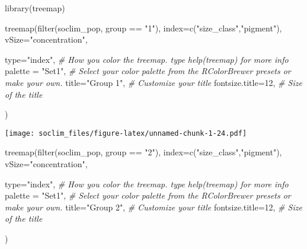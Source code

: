 \documentclass[
]{article}
\newenvironment{Shaded}{\begin{snugshade}}{\end{snugshade}}
\newcommand{\AttributeTok}[1]{\textcolor[rgb]{0.77,0.63,0.00}{#1}}
\newcommand{\CommentTok}[1]{\textcolor[rgb]{0.56,0.35,0.01}{\textit{#1}}}
\newcommand{\DecValTok}[1]{\textcolor[rgb]{0.00,0.00,0.81}{#1}}
\newcommand{\FunctionTok}[1]{\textcolor[rgb]{0.00,0.00,0.00}{#1}}
\newcommand{\NormalTok}[1]{#1}
\newcommand{\SpecialCharTok}[1]{\textcolor[rgb]{0.00,0.00,0.00}{#1}}
\newcommand{\StringTok}[1]{\textcolor[rgb]{0.31,0.60,0.02}{#1}}
\begin{document}
\begin{Shaded}
\begin{Highlighting}[]
\FunctionTok{library}\NormalTok{(treemap)}

\FunctionTok{treemap}\NormalTok{(}\FunctionTok{filter}\NormalTok{(soclim\_pop, group }\SpecialCharTok{==} \StringTok{"1"}\NormalTok{), }\AttributeTok{index=}\FunctionTok{c}\NormalTok{(}\StringTok{"size\_class"}\NormalTok{,}\StringTok{"pigment"}\NormalTok{), }\AttributeTok{vSize=}\StringTok{"concentration"}\NormalTok{,}
        
        \AttributeTok{type=}\StringTok{"index"}\NormalTok{,                            }\CommentTok{\# How you color the treemap. type help(treemap) for more info}
        \AttributeTok{palette =} \StringTok{"Set1"}\NormalTok{,                        }\CommentTok{\# Select your color palette from the RColorBrewer presets or make your own.}
        \AttributeTok{title=}\StringTok{"Group 1"}\NormalTok{,                      }\CommentTok{\# Customize your title}
        \AttributeTok{fontsize.title=}\DecValTok{12}\NormalTok{,                       }\CommentTok{\# Size of the title}
        
\NormalTok{) }
\end{Highlighting}
\end{Shaded}

\texttt{[image: soclim\_files/figure-latex/unnamed-chunk-1-24.pdf]}

\begin{Shaded}
\begin{Highlighting}[]
\FunctionTok{treemap}\NormalTok{(}\FunctionTok{filter}\NormalTok{(soclim\_pop, group }\SpecialCharTok{==} \StringTok{"2"}\NormalTok{), }\AttributeTok{index=}\FunctionTok{c}\NormalTok{(}\StringTok{"size\_class"}\NormalTok{,}\StringTok{"pigment"}\NormalTok{), }\AttributeTok{vSize=}\StringTok{"concentration"}\NormalTok{,}
        
        \AttributeTok{type=}\StringTok{"index"}\NormalTok{,                            }\CommentTok{\# How you color the treemap. type help(treemap) for more info}
        \AttributeTok{palette =} \StringTok{"Set1"}\NormalTok{,                        }\CommentTok{\# Select your color palette from the RColorBrewer presets or make your own.}
        \AttributeTok{title=}\StringTok{"Group 2"}\NormalTok{,                      }\CommentTok{\# Customize your title}
        \AttributeTok{fontsize.title=}\DecValTok{12}\NormalTok{,                       }\CommentTok{\# Size of the title}
        
\NormalTok{) }
\end{Highlighting}
\end{Shaded}
\end{document}
